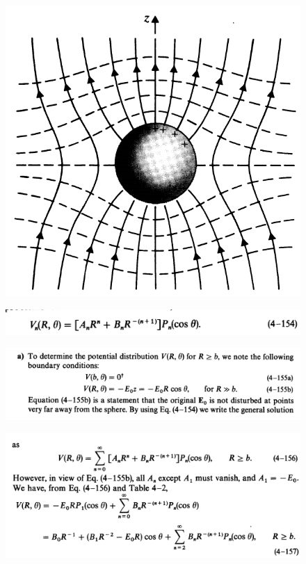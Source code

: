 \documentclass[xcolor={dvipsnames}]{beamer}
\begin{document}
\begin{frame}
\begin{figure}[H]
	\centering
	\includegraphics[width=0.8\linewidth]{5_5.png}
\end{figure}
\end{frame}
\begin{frame}
\begin{figure}[H]
	\centering
	\includegraphics[width=0.9\linewidth]{5_6.png}
\end{figure}
\begin{figure}[H]
	\centering
	\includegraphics[width=0.9\linewidth]{5_3.png}
\end{figure}
\begin{figure}[H]
	\centering
	\includegraphics[width=0.9\linewidth]{5_4.png}
\end{figure}
\end{frame}
\end{document}
